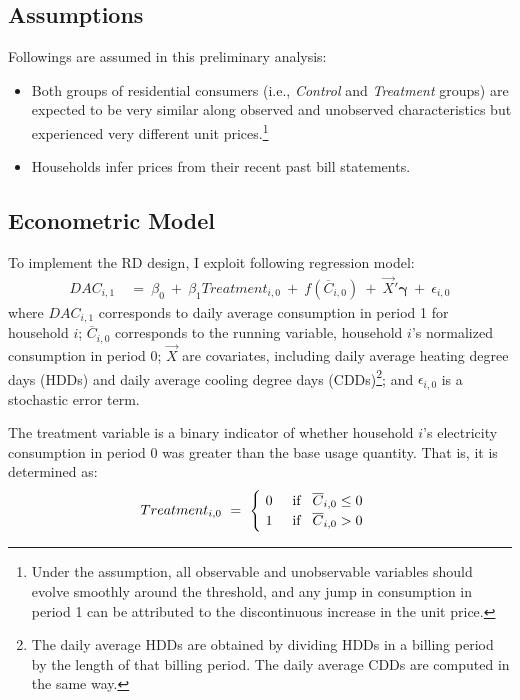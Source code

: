 \subsection{Assumptions}
Followings are assumed in this preliminary analysis:
\begin{itemize}
    \item
    Both groups of residential consumers (i.e., \textit{Control} and \textit{Treatment} groups) are expected to be very similar along observed and unobserved characteristics but experienced very different unit prices.\footnote{Under the assumption, all observable and unobservable variables should evolve smoothly around the threshold, and any jump in consumption in period 1 can be attributed to the discontinuous increase in the unit price.}
    
    \item
    Households infer prices from their recent past bill statements.
    
\end{itemize}

\subsection{Econometric Model}
To implement the RD design, I exploit following regression model:
\begin{equation}
    \begin{split}
        DAC_{i,1} \
        & = \ \beta_{0} \ + \ \beta_{1} Treatment_{i,0} \ + \ f(\overline{C}_{i,0}) \ + \ \vec{X}' \boldsymbol{\gamma} \ + \ \epsilon_{i,0}
    \end{split}
\label{Eq:Econometric-Model}
\end{equation}
where $DAC_{i,1}$ corresponds to daily average consumption in period 1 for household $i$; $\overline{C}_{i,0}$ corresponds to the running variable, household $i$'s normalized consumption in period 0; $\vec{X}$ are covariates, including daily average heating degree days (HDDs) and daily average cooling degree days (CDDs)\footnote{The daily average HDDs are obtained by dividing HDDs in a billing period by the length of that billing period. The daily average CDDs are computed in the same way.}; and $\epsilon_{i,0}$ is a stochastic error term.

The treatment variable is a binary indicator of whether household $i$'s electricity consumption in period 0 was greater than the base usage quantity. That is, it is determined as:
\begin{equation}
    Treatment_{i,0} \ = \
    \begin{cases}
        \ 0 \hspace{0.5cm} \text{if} \hspace{0.3cm} \overline{C}_{i,0} \leq 0 \\
        \ 1 \hspace{0.5cm} \text{if} \hspace{0.3cm} \overline{C}_{i,0} > 0
    \end{cases}
\end{equation}

